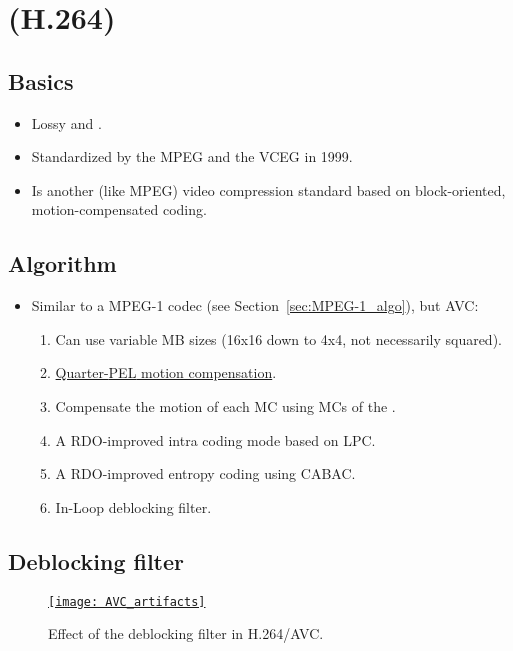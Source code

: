 \chapter{ (H.264)}

\section{Basics}
\begin{itemize}
\item Lossy and  \cite{wikipedia_AVC}.
\item Standardized by the \gls{MPEG} and the \gls{VCEG} in 1999.
\item Is another (like \gls{MPEG}) video compression standard based on
  block-oriented, motion-compensated coding.
\end{itemize}

\section{Algorithm}
\label{sec:MPEG-4_AVC_algo}
\begin{itemize}
\item Similar to a MPEG-1 codec (see Section~\ref{sec:MPEG-1_algo}),
  but \gls{AVC}:
\begin{enumerate}
\item Can use variable MB sizes (16x16 down to 4x4, not
  necessarily squared).
\item
  \href{https://en.wikipedia.org/wiki/Motion_compensation}{Quarter-\gls{PEL}
    motion compensation}.
\item Compensate the motion of each MC using MCs of the
  .
\item A \gls{RDO}-improved intra coding mode based on \gls{LPC}.
\item A \gls{RDO}-improved entropy coding using \gls{CABAC}.
\item In-Loop deblocking filter.
\end{enumerate}
\end{itemize}

\section{Deblocking filter}

\begin{figure}[H]
  \vspace{-2ex}
  \centering
  \href{https://www.sciencedirect.com/science/article/pii/B9780124157606000167}{\texttt{[image: AVC\_artifacts]}}
  \caption{Effect of the deblocking filter in H.264/\gls{AVC}.}
  \label{fig:H264_deblocking}
\end{figure}
